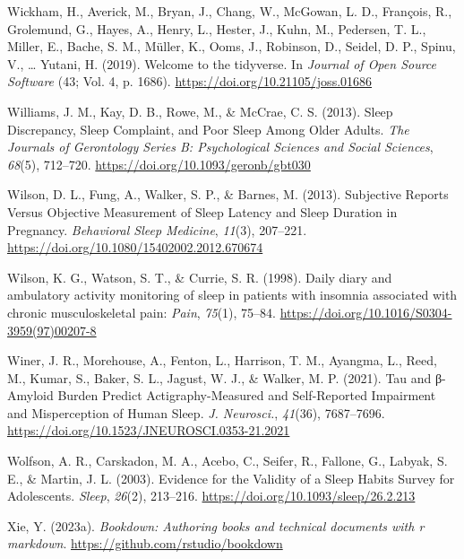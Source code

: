 \documentclass[
]{article}
\newlength{\cslhangindent}
\newenvironment{CSLReferences}[2] %
 {\begin{list}{}{%
  \setlength{\itemindent}{0pt}
  \setlength{\leftmargin}{0pt}
  \setlength{\parsep}{0pt}
  \ifodd #1
   \setlength{\leftmargin}{\cslhangindent}
   \setlength{\itemindent}{-1\cslhangindent}
  \fi
  \setlength{\itemsep}{#2\baselineskip}}}
 {\end{list}}
\begin{document}
\begin{CSLReferences}{1}{0}
Wickham, H., Averick, M., Bryan, J., Chang, W., McGowan, L. D., François, R., Grolemund, G., Hayes, A., Henry, L., Hester, J., Kuhn, M., Pedersen, T. L., Miller, E., Bache, S. M., Müller, K., Ooms, J., Robinson, D., Seidel, D. P., Spinu, V., \ldots{} Yutani, H. (2019). Welcome to the {tidyverse}. In \emph{Journal of Open Source Software} (43; Vol. 4, p. 1686). \url{https://doi.org/10.21105/joss.01686}

Williams, J. M., Kay, D. B., Rowe, M., \& McCrae, C. S. (2013). Sleep {Discrepancy}, {Sleep} {Complaint}, and {Poor} {Sleep} {Among} {Older} {Adults}. \emph{The Journals of Gerontology Series B: Psychological Sciences and Social Sciences}, \emph{68}(5), 712--720. \url{https://doi.org/10.1093/geronb/gbt030}

Wilson, D. L., Fung, A., Walker, S. P., \& Barnes, M. (2013). Subjective {Reports} {Versus} {Objective} {Measurement} of {Sleep} {Latency} and {Sleep} {Duration} in {Pregnancy}. \emph{Behavioral Sleep Medicine}, \emph{11}(3), 207--221. \url{https://doi.org/10.1080/15402002.2012.670674}

Wilson, K. G., Watson, S. T., \& Currie, S. R. (1998). Daily diary and ambulatory activity monitoring of sleep in patients with insomnia associated with chronic musculoskeletal pain: \emph{Pain}, \emph{75}(1), 75--84. \url{https://doi.org/10.1016/S0304-3959(97)00207-8}

Winer, J. R., Morehouse, A., Fenton, L., Harrison, T. M., Ayangma, L., Reed, M., Kumar, S., Baker, S. L., Jagust, W. J., \& Walker, M. P. (2021). Tau and β-{Amyloid} {Burden} {Predict} {Actigraphy}-{Measured} and {Self}-{Reported} {Impairment} and {Misperception} of {Human} {Sleep}. \emph{J. Neurosci.}, \emph{41}(36), 7687--7696. \url{https://doi.org/10.1523/JNEUROSCI.0353-21.2021}

Wolfson, A. R., Carskadon, M. A., Acebo, C., Seifer, R., Fallone, G., Labyak, S. E., \& Martin, J. L. (2003). Evidence for the {Validity} of a {Sleep} {Habits} {Survey} for {Adolescents}. \emph{Sleep}, \emph{26}(2), 213--216. \url{https://doi.org/10.1093/sleep/26.2.213}

Xie, Y. (2023a). \emph{Bookdown: Authoring books and technical documents with r markdown}. \url{https://github.com/rstudio/bookdown}


\end{CSLReferences}
\end{document}
